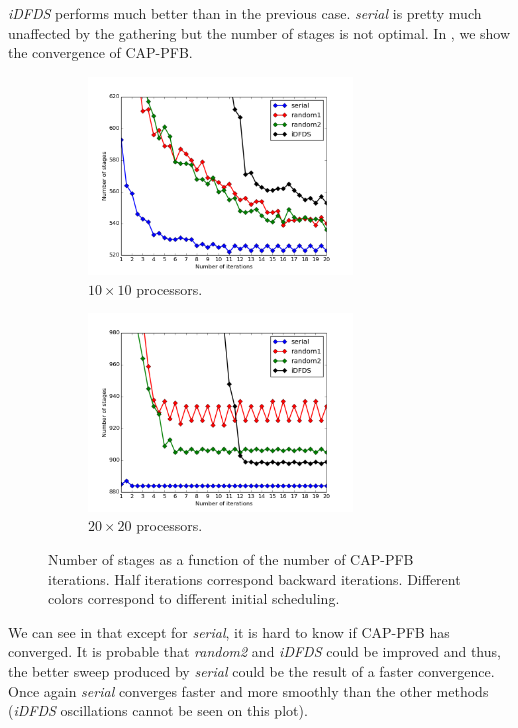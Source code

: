 \documentclass[letterpaper]{article}
\renewcommand{\(}{\left(}
\renewcommand{\)}{\right)}
\renewcommand{\[}{\left[}
\renewcommand{\]}{\right]}
\begin{document}
\emph{iDFDS} performs much better than in the previous case. \emph{serial} is
pretty much unaffected by the gathering but the number of stages is not optimal.
In , we show the convergence of CAP-PFB. 
\begin{figure}[H]
  \begin{subfigure}[b]{.5\textwidth}
    \centering
    \includegraphics[width=7cm]{convergence_band_20_20}
    \caption{$10\times 10$ processors.}
    \label{cb_10_10}
  \end{subfigure}
  \begin{subfigure}[b]{.5\textwidth}
    \centering
    \includegraphics[width=7cm]{convergence_band_40_40}
    \caption{$20\times 20$ processors.}
  \end{subfigure}
  \caption{Number of stages as a function of the number of CAP-PFB iterations.
  Half iterations correspond backward iterations. Different colors correspond to
  different initial scheduling.}
  \label{convergence_band}
\end{figure}
 
We can see in  that except for \emph{serial}, it is hard to know
if CAP-PFB has converged. It is probable that \emph{random2} and \emph{iDFDS} could be
improved and thus, the better sweep produced by \emph{serial} could be the
result of a faster convergence. Once again \emph{serial} converges faster and
more smoothly than the other methods (\emph{iDFDS} oscillations cannot be seen
on this plot).
\end{document}
